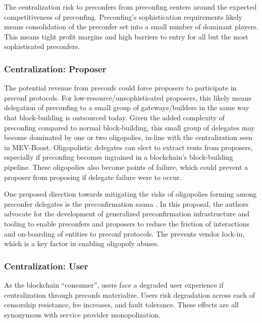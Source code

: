 \documentclass[a4paper]{article}
\theoremstyle{boldstyle}
\begin{document}
    The centralization risk to preconfers from preconfing centers around the expected competitiveness of preconfing. Preconfing's sophistication requirements likely means consolidation of the preconfer set into a small number of dominant players. This means tight profit margins and high barriers to entry for all but the most sophisticated preconfers. 
        
    
    \subsubsection{Centralization: Proposer}
    
    The potential revenue from preconfs could force proposers to participate in preconf protocols. For low-resource/unsophisticated proposers, this likely means delegation of preconfing to a small group of gateways/builders in the same way that block-building is outsourced today. Given the added complexity of preconfing compared to normal block-building, this small group of delegates may become dominated by one or two oligopolies, in-line with the centralization seen in MEV-Boost\cite{MEVBoostShares}. Oligopolistic delegates can elect to extract rents from proposers, especially if preconfing becomes ingrained in a blockchain's block-building pipeline. These oligopolies also become points of failure, which could prevent a proposer from proposing if delegate failure were to occur. 

    One proposed direction towards mitigating the risks of oligopolies forming among preconfer delegates is the preconfirmation sauna \cite{W:ThePreconfirmationSauna}. In this proposal, the authors advocate for the development of generalized preconfirmation infrastructure and tooling to enable preconfers and proposers to reduce the friction of interactions and on-boarding of entities to preconf protocols. The prevents vendor lock-in, which is a key factor in enabling oligopoly abuses.


    
    \subsubsection{Centralization: User}

    As the blockchain ``consumer'', users face a degraded user experience if centralization through preconfs materialize. Users risk degradation across each of censorship resistance, fee increases, and fault tolerance. These effects are all synonymous with service provider monopolization.
\end{document}
